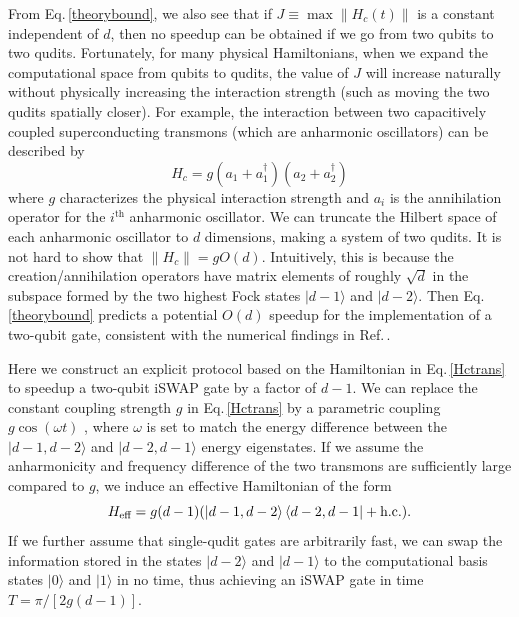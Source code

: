 \documentclass[twocolumn,english,pra,superscriptaddress]{revtex4-1}
\begin{document}
From Eq.\,\eqref{theorybound}, we also see that if $J \equiv \max \lVert H_c(t) \rVert $ is a constant independent of $d$, then no speedup can be obtained if we go from two qubits to two qudits. Fortunately, for many physical Hamiltonians, when we expand the computational space from qubits to qudits, the value of $J$ will increase naturally without physically increasing the interaction strength (such as moving the two qudits spatially closer). For example, the interaction between two capacitively coupled superconducting transmons (which are anharmonic oscillators) can be described by
\begin{equation} \label{Hctrans}
    H_c = g (a_1 + a_1^\dagger)(a_2 + a_2^\dagger)
\end{equation}
where $g$ characterizes the physical interaction strength and $a_i$ is the annihilation operator for the $i^{\text{th}}$ anharmonic oscillator. We can truncate the Hilbert space of each anharmonic oscillator to $d$ dimensions, making a system of two qudits. It is not hard to show that $\lVert H_c\rVert=gO(d)$. Intuitively, this is because the creation/annihilation operators have matrix elements of roughly $\sqrt{d}$ in the subspace formed by the two highest Fock states $|d-1\rangle$ and $|d-2\rangle$. Then Eq.\,\eqref{theorybound} predicts a potential $O(d)$ speedup for the implementation of a two-qubit gate, consistent with the numerical findings in Ref.\,\cite{Ashhab}.

Here we construct an explicit protocol based on the Hamiltonian in Eq.\,\eqref{Hctrans} to speedup a two-qubit iSWAP gate by a factor of $d-1$. We can replace the constant coupling strength $g$ in Eq.\,\eqref{Hctrans} by a parametric coupling $g \cos(\omega t)$ \cite{RayParam}, where $\omega$ is set to match the energy difference between the $|d-1,d-2\rangle$ and $|d-2,d-1\rangle$ energy eigenstates. If we assume the anharmonicity and frequency difference of the two transmons are sufficiently large compared to $g$, we induce an effective Hamiltonian of the form
\begin{equation} \label{Heff1}
    H_{\text{eff}} = g (d-1) ( \ket{d-1,d-2}\bra{d-2,d-1} + \text{h.c.}).
\end{equation}
If we further assume that single-qudit gates are arbitrarily fast, we can swap the information stored in the states $|d-2\rangle$ and $|d-1\rangle$ to the computational basis states $|0\rangle$ and $|1\rangle$ in no time, thus achieving an iSWAP gate in time $T=\pi/[2g(d-1)]$.
\end{document}

